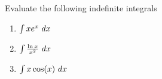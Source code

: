 \documentclass[12pt, a4paper]{article}
\begin{document}
\vspace{-0.75in}
\begin{ex}
  Evaluate the following indefinite integrals
  \begin{enumerate}
  \item \(\int x e^x \ d x\)
    \vspace{0.75in}
  \item \(\int \frac{\ln x}{x^2} \ d x\)
    \vspace{0.75in}
  \item \(\int x \cos(x) \ d x\)
  \end{enumerate}
\end{ex}
\end{document}
